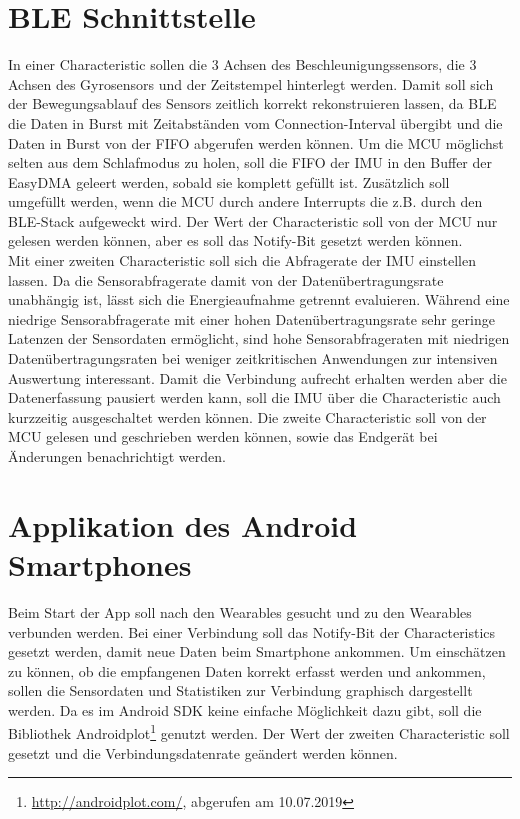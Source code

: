 \section{BLE Schnittstelle}
In einer Characteristic sollen die 3 Achsen des Beschleunigungssensors, die 3 Achsen des Gyrosensors und der Zeitstempel hinterlegt werden.
Damit soll sich der Bewegungsablauf des Sensors zeitlich korrekt rekonstruieren lassen, da BLE die Daten in Burst mit Zeitabständen vom Connection-Interval übergibt und die Daten in Burst von der FIFO abgerufen werden können.
Um die MCU möglichst selten aus dem Schlafmodus zu holen, soll die FIFO der IMU in den Buffer der EasyDMA geleert werden, sobald sie komplett gefüllt ist.
Zusätzlich soll umgefüllt werden, wenn die MCU durch andere Interrupts die z.B. durch den BLE-Stack aufgeweckt wird.
Der Wert der Characteristic soll von der MCU nur gelesen werden können, aber es soll das Notify-Bit gesetzt werden können.\\
Mit einer zweiten Characteristic soll sich die Abfragerate der IMU einstellen lassen.
Da die Sensorabfragerate damit von der Datenübertragungsrate unabhängig ist, lässt sich die Energieaufnahme getrennt evaluieren.
Während eine niedrige Sensorabfragerate mit einer hohen Datenübertragungsrate sehr geringe Latenzen der Sensordaten ermöglicht, sind hohe Sensorabfrageraten mit niedrigen Datenübertragungsraten bei weniger zeitkritischen Anwendungen zur intensiven Auswertung interessant.
Damit die Verbindung aufrecht erhalten werden aber die Datenerfassung pausiert werden kann, soll die IMU über die Characteristic auch kurzzeitig ausgeschaltet werden können.
Die zweite Characteristic soll von der MCU gelesen und geschrieben werden können, sowie das Endgerät bei Änderungen benachrichtigt werden.

\section{Applikation des Android Smartphones}
Beim Start der App soll nach den Wearables gesucht und zu den Wearables verbunden werden.
Bei einer Verbindung soll das Notify-Bit der Characteristics gesetzt werden, damit neue Daten beim Smartphone ankommen.
Um einschätzen zu können, ob die empfangenen Daten korrekt erfasst werden und ankommen, sollen die Sensordaten und Statistiken zur Verbindung graphisch dargestellt werden.
Da es im Android SDK keine einfache Möglichkeit dazu gibt, soll die Bibliothek Androidplot\footnote{\url{http://androidplot.com/}, abgerufen am 10.07.2019} genutzt werden.
Der Wert der zweiten Characteristic soll gesetzt und die Verbindungsdatenrate geändert werden können.
